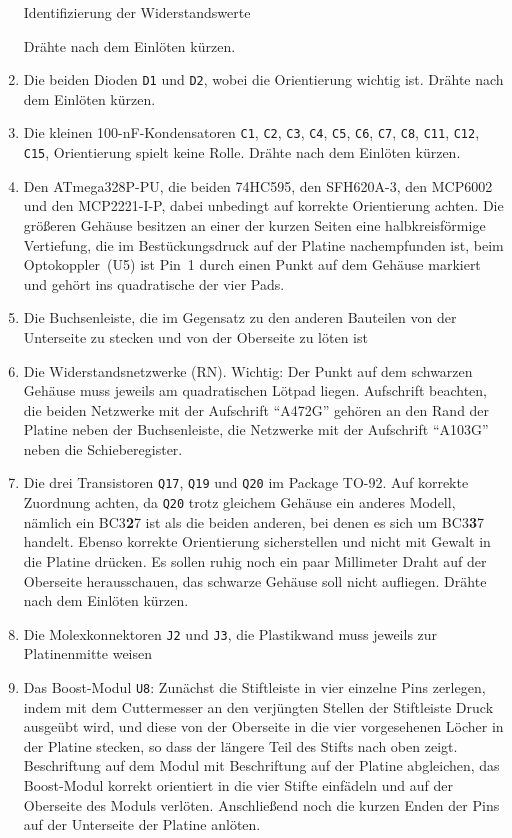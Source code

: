 \documentclass[paper=a4, open=any]{scrbook}
\begin{document}
\begin{enumerate}
\begin{table}
\begin{center}
\begin{minipage}[b]{.2\textwidth}
						      	\end{minipage}						  			
						      \end{center}
						      \caption{Identifizierung der Widerstandswerte}
						      \label{tab:widerstandswerte}
					      \end{table}
					      Drähte nach dem Einlöten kürzen.

					\item Die beiden Dioden \texttt{D1} und \texttt{D2}, wobei die Orientierung wichtig ist. Drähte nach dem Einlöten kürzen.
					\item Die kleinen 100-nF-Kondensatoren \texttt{C1}, \texttt{C2}, \texttt{C3}, \texttt{C4}, \texttt{C5}, \texttt{C6}, \texttt{C7}, \texttt{C8}, \texttt{C11}, \texttt{C12}, \texttt{C15}, Orientierung spielt keine Rolle. Drähte nach dem Einlöten kürzen.
					\item Den ATmega328P-PU, die beiden 74HC595, den SFH620A-3, den MCP6002 und den MCP2221-I-P, dabei unbedingt auf korrekte Orientierung achten. Die größeren Gehäuse besitzen an einer der kurzen Seiten eine halbkreisförmige Vertiefung, die im Bestückungsdruck auf der Platine nachempfunden ist, beim Optokoppler~(U5) ist Pin~1 durch einen Punkt auf dem Gehäuse markiert und gehört ins quadratische der vier Pads.
					\item Die Buchsenleiste, die im Gegensatz zu den anderen Bauteilen von der Unterseite zu stecken und von der Oberseite zu löten ist
					\item Die Widerstandsnetzwerke (RN). Wichtig: Der Punkt auf dem schwarzen Gehäuse muss jeweils am quadratischen Lötpad liegen. Aufschrift beachten, die beiden Netzwerke mit der Aufschrift \enquote{A472G} gehören an den Rand der Platine neben der Buchsenleiste, die Netzwerke mit der Aufschrift \enquote{A103G} neben die Schieberegister.
					\item Die drei Transistoren \texttt{Q17}, \texttt{Q19} und \texttt{Q20} im Package TO-92. Auf korrekte Zuordnung achten, da \texttt{Q20} trotz gleichem Gehäuse ein anderes Modell, nämlich ein BC3\textbf{2}7 ist als die beiden anderen, bei denen es sich um BC3\textbf{3}7 handelt. Ebenso korrekte Orientierung sicherstellen und nicht mit Gewalt in die Platine drücken. Es sollen ruhig noch ein paar Millimeter Draht auf der Oberseite herausschauen, das schwarze Gehäuse soll nicht aufliegen. Drähte nach dem Einlöten kürzen.
					\item Die Molexkonnektoren \texttt{J2} und \texttt{J3}, die Plastikwand muss jeweils zur Platinenmitte weisen
					\item Das Boost-Modul \texttt{U8}: Zunächst die Stiftleiste in vier einzelne Pins zerlegen, indem mit dem Cuttermesser an den verjüngten Stellen der Stiftleiste Druck ausgeübt wird, und diese von der Oberseite in die vier vorgesehenen Löcher in der Platine stecken, so dass der längere Teil des Stifts nach oben zeigt. Beschriftung auf dem Modul mit Beschriftung auf der Platine abgleichen, das Boost-Modul korrekt orientiert in die vier Stifte einfädeln und auf der Oberseite des Moduls verlöten. Anschließend noch die kurzen Enden der Pins auf der Unterseite der Platine anlöten.

\end{enumerate}
\end{document}
